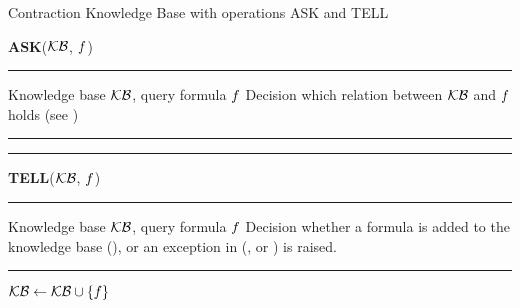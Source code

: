 \begin{algorithm}[hbt!]
    \caption{Contraction Knowledge Base with operations ASK and TELL}\label{alg:contractionKB}
    \vspace{0.3cm} \textbf{ASK}($\mathcal{KB}$, $f$)
    \begin{algorithmic}
    \hrule
    \Require Knowledge base $\mathcal{KB}$, query formula $f$
    \Ensure Decision which relation between $\mathcal{KB}$ and $f$ holds (see )
    \hrule
        \State{$\hypercoreat{\formulavar} \algdefsymbol \contractionof{\{\secexformulaat{\shortcatvariables} \, : \, \secexformula\in\kb\},\bencodingofat{\exformula}{\formulavar,\shortcatvariables}}{\formulavar}$}
            \State \Return {}
            \State \Return {}
            \State \Return {}
        \Else
            \State \Return {}
        \EndIf
    \hrule
    \end{algorithmic}
    \vspace{0.3cm} \textbf{TELL}($\mathcal{KB}$, $f$)
    \begin{algorithmic}
        \hrule
    \Require Knowledge base $\mathcal{KB}$, query formula $f$
    \Ensure Decision whether a formula is added to the knowledge base (), or an exception in (,  or ) is raised.
    \hrule
            \State \Return {}
            \State \Return {}
            \State \Return {}
            \State $\mathcal{KB} \leftarrow \mathcal{KB}\cup\{f\}$
            \State \Return {}
        \EndIf
    \end{algorithmic}

\end{algorithm}





